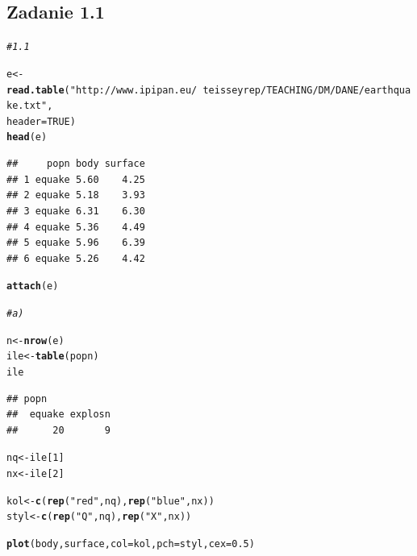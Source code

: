 \documentclass[10pt,a4paper]{article}\usepackage[]{graphicx}\usepackage[]{color}
\makeatletter
\newcommand{\hlnum}[1]{\textcolor[rgb]{0.686,0.059,0.569}{#1}}%
\newcommand{\hlstr}[1]{\textcolor[rgb]{0.192,0.494,0.8}{#1}}%
\newcommand{\hlcom}[1]{\textcolor[rgb]{0.678,0.584,0.686}{\textit{#1}}}%
\newcommand{\hlstd}[1]{\textcolor[rgb]{0.345,0.345,0.345}{#1}}%
\newcommand{\hlkwb}[1]{\textcolor[rgb]{0.69,0.353,0.396}{#1}}%
\newcommand{\hlkwc}[1]{\textcolor[rgb]{0.333,0.667,0.333}{#1}}%
\newcommand{\hlkwd}[1]{\textcolor[rgb]{0.737,0.353,0.396}{\textbf{#1}}}%
\newenvironment{kframe}{%
 \def\at@end@of@kframe{}%
 \ifinner\ifhmode%
  \def\at@end@of@kframe{\end{minipage}}%
  \begin{minipage}{\columnwidth}%
 \fi\fi%
 \def\FrameCommand##1{\hskip\@totalleftmargin \hskip-\fboxsep
 \colorbox{shadecolor}{##1}\hskip-\fboxsep
     \hskip-\linewidth \hskip-\@totalleftmargin \hskip\columnwidth}%
 \MakeFramed {\advance\hsize-\width
   \@totalleftmargin\z@ \linewidth\hsize
   \@setminipage}}%
 {\par\unskip\endMakeFramed%
 \at@end@of@kframe}
\newenvironment{knitrout}{}{} %
\makeatother
\begin{document}
\subsection*{Zadanie 1.1}

\begin{knitrout}
\color{fgcolor}\begin{kframe}
\begin{alltt}
\hlcom{# 1.1}

\hlstd{e} \hlkwb{<-} \hlkwd{read.table}\hlstd{(}\hlstr{"http://www.ipipan.eu/~teisseyrep/TEACHING/DM/DANE/earthquake.txt"}\hlstd{,}
    \hlkwc{header} \hlstd{=} \hlnum{TRUE}\hlstd{)}
\hlkwd{head}\hlstd{(e)}
\end{alltt}
\begin{verbatim}
##     popn body surface
## 1 equake 5.60    4.25
## 2 equake 5.18    3.93
## 3 equake 6.31    6.30
## 4 equake 5.36    4.49
## 5 equake 5.96    6.39
## 6 equake 5.26    4.42
\end{verbatim}
\begin{alltt}
\hlkwd{attach}\hlstd{(e)}

\hlcom{# a)}

\hlstd{n} \hlkwb{<-} \hlkwd{nrow}\hlstd{(e)}
\hlstd{ile} \hlkwb{<-} \hlkwd{table}\hlstd{(popn)}
\hlstd{ile}
\end{alltt}
\begin{verbatim}
## popn
##  equake explosn 
##      20       9
\end{verbatim}
\begin{alltt}
\hlstd{nq} \hlkwb{<-} \hlstd{ile[}\hlnum{1}\hlstd{]}
\hlstd{nx} \hlkwb{<-} \hlstd{ile[}\hlnum{2}\hlstd{]}

\hlstd{kol} \hlkwb{<-} \hlkwd{c}\hlstd{(}\hlkwd{rep}\hlstd{(}\hlstr{"red"}\hlstd{, nq),} \hlkwd{rep}\hlstd{(}\hlstr{"blue"}\hlstd{, nx))}
\hlstd{styl} \hlkwb{<-} \hlkwd{c}\hlstd{(}\hlkwd{rep}\hlstd{(}\hlstr{"Q"}\hlstd{, nq),} \hlkwd{rep}\hlstd{(}\hlstr{"X"}\hlstd{, nx))}

\hlkwd{plot}\hlstd{(body, surface,} \hlkwc{col} \hlstd{= kol,} \hlkwc{pch} \hlstd{= styl,} \hlkwc{cex} \hlstd{=} \hlnum{0.5}\hlstd{)}
\end{alltt}
\end{kframe}


\end{knitrout}
\end{document}
